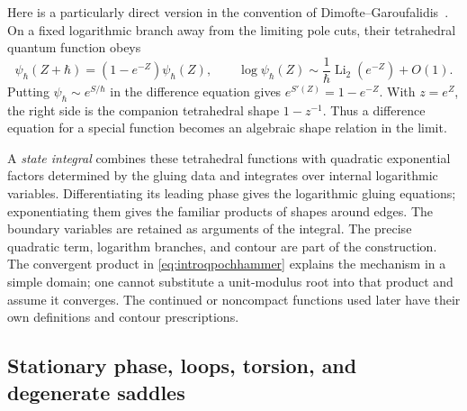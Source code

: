 Here is a particularly direct version in the convention of
Dimofte--Garoufalidis~\cite[Section 5.1]{DimofteGaroufalidis}.
On a fixed logarithmic branch away from the limiting pole cuts,
their tetrahedral quantum function obeys
\begin{equation}
 \psi_\hbar(Z+\hbar)=(1-e^{-Z})\psi_\hbar(Z),\qquad
 \log\psi_\hbar(Z)\sim\frac1\hbar\operatorname{Li}_2(e^{-Z})+O(1).
 \label{eq:introquantumshape}
\end{equation}
Putting $\psi_\hbar\sim e^{S/\hbar}$ in the difference equation
gives $e^{S'(Z)}=1-e^{-Z}$. With $z=e^Z$, the right side is
the companion tetrahedral shape $1-z^{-1}$. Thus a difference
equation for a special function becomes an algebraic shape relation
in the limit.

A \emph{state integral} combines these tetrahedral functions with
quadratic exponential factors determined by the gluing data and
integrates over internal logarithmic variables. Differentiating its
leading phase gives the logarithmic gluing equations; exponentiating
them gives the familiar products of shapes around edges. The
boundary variables are retained as arguments of the integral.
The precise quadratic term, logarithm branches, and contour are
part of the construction. The convergent product in
\eqref{eq:introqpochhammer} explains the mechanism in a simple
domain; one cannot substitute a unit-modulus root into that product
and assume it converges. The continued or noncompact functions used
later have their own definitions and contour prescriptions.
\subsection{Stationary phase, loops, torsion, and degenerate saddles}
\label{sec:introsemiclassical}

